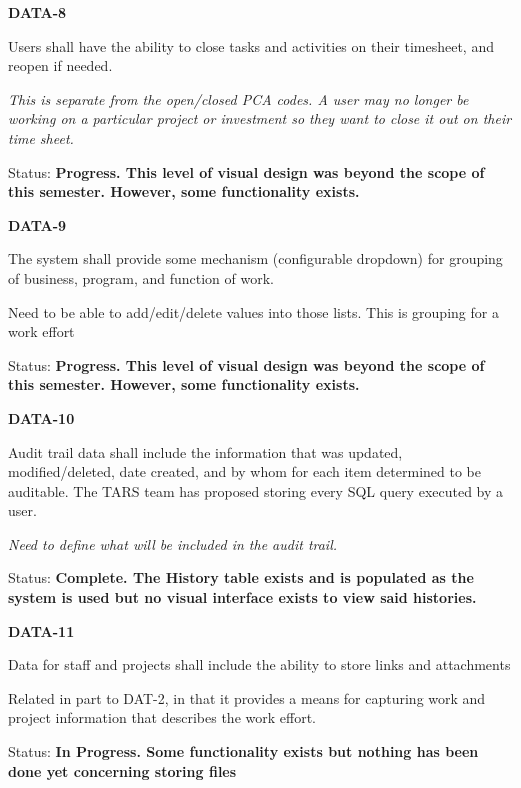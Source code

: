 \documentclass{article}
\begin{document}
\noindent \textit{}


\noindent \textbf{DATA-8}

\noindent Users shall have the ability to close tasks and activities on their timesheet, and reopen if needed.

\noindent \textit{This is separate from the open/closed PCA codes.  A user may no longer be working on a particular project or investment so they want to close it out on their time sheet.}

\noindent Status: \textbf{Progress.  This level of visual design was beyond the scope of this semester.  However, some functionality exists.}

\noindent \textit{}


\noindent \textbf{DATA-9}

\noindent The system shall provide some mechanism (configurable dropdown) for grouping of business, program, and function of work.

Need to be able to add/edit/delete values into those lists. This is grouping for a work effort

\noindent Status: \textbf{Progress.  This level of visual design was beyond the scope of this semester.  However, some functionality exists.}

\noindent \textit{}


\noindent \textbf{DATA-10}

\noindent Audit trail data shall include the information that was updated, modified/deleted, date created, and by whom for each item determined to be auditable. The TARS team has proposed storing every SQL query executed by a user.

 \textit{Need to define what will be included in the audit trail.}

\noindent Status: \textbf{Complete.  The History table exists and is populated as the system is used but no visual interface exists to view said histories.}\textit{}

\noindent \textit{}


\noindent \textbf{DATA-11}

\noindent Data for staff and projects shall include the ability to store links and attachments

\noindent Related in part to DAT-2, in that it provides a means for capturing work and project information that describes the work effort.

\noindent Status: \textbf{In Progress.  Some functionality exists but nothing has been done yet concerning storing files} 
\end{document}

